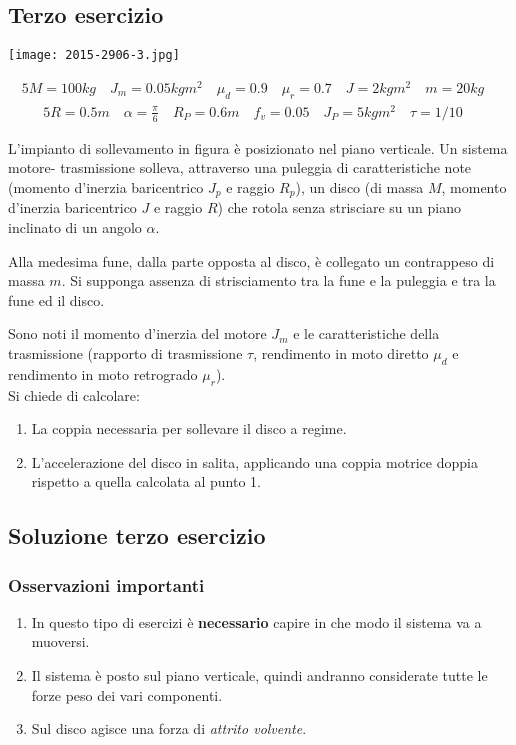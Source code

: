 \documentclass[main.tex]{subfiles}
\begin{document}
\subsection{Terzo esercizio}

\texttt{[image: 2015-2906-3.jpg]}

\begin{alignat*}{5}
  M=100 kg\quad
  J_m=0.05 kg m^2\quad
  \mu_d =0.9\quad
  \mu_r =0.7\quad
  J=2 kg m^2\quad
  m = 20 kg\quad
\end{alignat*}
\begin{alignat*}{5}
  R=0.5 m \quad
  \alpha =\frac{\pi}{6} \quad
  R_P=0.6 m \quad
  f_v = 0.05\quad
  J_P=5 kg m^2 \quad
  \tau = 1/10 \quad
\end{alignat*}

L’impianto di sollevamento in figura è posizionato nel piano verticale. Un sistema motore- trasmissione solleva, attraverso una puleggia di caratteristiche note (momento d’inerzia baricentrico $J_p$ e raggio $R_p$), un disco (di massa $M$, momento d’inerzia baricentrico $J$ e raggio $R$) che rotola senza strisciare su un piano inclinato di un angolo $\alpha$.

Alla medesima fune, dalla parte opposta al disco, è collegato un contrappeso di massa $m$. Si supponga assenza di strisciamento tra la fune e la puleggia e tra la fune ed il disco.

Sono noti il momento d'inerzia del motore $J_m$ e le caratteristiche della trasmissione (rapporto di trasmissione $\tau$, rendimento in moto diretto $\mu_d$ e rendimento in moto retrogrado $\mu_r$).
\\

Si chiede di calcolare:
\begin{enumerate}
  \item La coppia necessaria per sollevare il disco a regime.
  \item L’accelerazione del disco in salita, applicando una coppia motrice doppia rispetto a quella calcolata al punto 1.
\end{enumerate}

\pagebreak

\subsection{Soluzione terzo esercizio}

\subsubsection{Osservazioni importanti}
\begin{enumerate}
  \item In questo tipo di esercizi è \textbf{necessario} capire in che modo il sistema va a muoversi.
  \item Il sistema è posto sul piano verticale, quindi andranno considerate tutte le forze peso dei vari componenti.
  \item Sul disco agisce una forza di \textit{attrito volvente}.
\end{enumerate}
\end{document}
